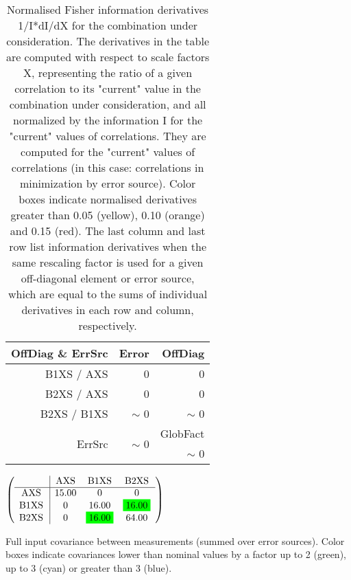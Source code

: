 \begin{table}[H]
\scriptsize
\begin{center}
\renewcommand{\arraystretch}{1.1}
\begin{tabular}{|r|r|r|}
\hline
 OffDiag \& ErrSrc & {\tiny Error} & OffDiag\\
\hline
B1XS / AXS &  0 &  0 \\
B2XS / AXS &  0 &  0 \\
B2XS / B1XS &  {\tiny $\sim$ }0 &  {\tiny $\sim$ }0 \\
\hline
\multirow{2}{*}{ErrSrc} & \multirow{2}{*}{ {\tiny $\sim$ }0} & GlobFact\\
 & &  {\tiny $\sim$ }0 \\
\hline
\end{tabular}
\renewcommand{\arraystretch}{1}
\caption{Normalised Fisher information derivatives 1/I*dI/dX for the combination under consideration. The derivatives in the table are computed with respect to scale factors X, representing the ratio of a given correlation to its "current" value in the combination under consideration, and all normalized by the information I for the "current" values of correlations. They are computed for the "current" values of correlations (in this case: correlations in minimization by error source). Color boxes indicate normalised derivatives greater than 0.05 (yellow), 0.10 (orange) and 0.15 (red). The last column and last row list information derivatives when the same rescaling factor is used for a given off-diagonal element or error source, which are equal to the sums of individual derivatives in each row and column, respectively.}
\end{center}
\end{table}
\begin{table}[H]
\scriptsize
\begin{center}
\renewcommand{\arraystretch}{1.1}
\begin{math}\left(\begin{array}{c|ccc}
 & \mathrm{AXS} & 
\mathrm{B1XS} & 
\mathrm{B2XS} \\
\hline
\mathrm{AXS} \hspace*{2pt} &      15.00 &  0 &  0 \\
\mathrm{B1XS} \hspace*{2pt} &  0 &      16.00 &  \colorbox{Green1}{$     16.00$} \\
\mathrm{B2XS} \hspace*{2pt} &  0 &  \colorbox{Green1}{$     16.00$} &      64.00 \\
\end{array}\right)\end{math}
\caption{Full input covariance between measurements (summed over error sources). Color boxes indicate covariances lower than nominal values by a factor up to 2 (green), up to 3 (cyan) or greater than 3 (blue).}
\renewcommand{\arraystretch}{1}
\end{center}
\end{table}

